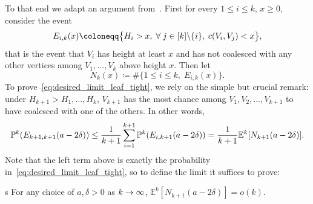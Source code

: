 \documentclass[AHL,Unicode,published]{cedram}
\newcommand{\probak}[1]{\mathbb{P}^k\left(#1\right)}
\newcommand{\E}{\mathbb{E}}
\newcommand{\1}{\mathbbm{1}}
\let\originalleft\left
\let\originalright\right
\renewcommand{\left}{\mathopen{}\mathclose\bgroup\originalleft}
\renewcommand{\right}{\aftergroup\egroup\originalright}
\renewcommand*{\to}{\mathchoice{\longrightarrow}{\rightarrow}{\rightarrow}{\rightarrow}}
\let\oldforall\forall
\renewcommand*{\forall}{\mathrel{\oldforall}}
\begin{document}
To that end we adapt an argument from~\cite[Section~6.5]{BBKKbis23+}. First for every $1\leq i\leq k$, $x\geq 0$, consider the event
\[
E_{i,k}(x)\coloneqq \bigl\{H_i>x, \;\forall j\in [k]\backslash \{i\}, \; c\left(V_i,V_j\right)<x\bigr\},
\]
that is the event that $V_i$ has height at least $x$ and has not coalesced with any other vertices among $V_1,\dots, V_k$ above height $x$. Then let
\[
N_k(x)\coloneqq\#\{1\leq i \leq k,\; E_{i,k}(x) \}.
\]
To prove~\eqref{eq:desired_limit_leaf_tight}, we rely on the simple but crucial remark: under $H_{k+1}>H_1,\dots, H_k$, $V_{k+1}$ has the most chance among $V_1,V_2,\dots, V_{k+1}$ to have coalesced with one of the others. In other words,
\[
\probak{E_{k+1,k+1}(a-2\delta)} \leq \frac{1}{k+1}\sum_{i=1}^{k+1} \probak{E_{i,k+1}(a-2\delta)} = \frac{1}{k+1} \E^k\left [N_{k+1}(a-2\delta)\right].
\]
Note that the left term above is exactly the probability in~\eqref{eq:desired_limit_leaf_tight}, so to define the limit it suffices to prove:

\begin{lemm}s\label{lem:end_lim_leaf-tight}
For any choice of $a,\delta>0$ as $k\to \infty$, $\E^k[N_{k+1}(a-2\delta)]=o(k)$.
\end{lemm}
\end{document}
